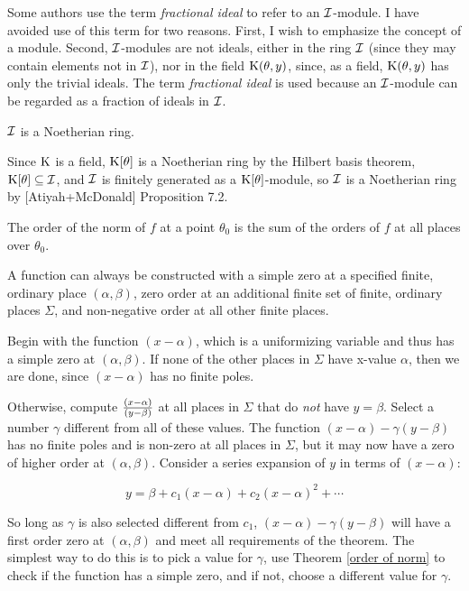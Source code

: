 Some authors use the term {\it fractional ideal} to refer to an ${\cal
I}$-module.  I have avoided use of this term for two reasons.  First,
I wish to emphasize the concept of a module.  Second, ${\cal
I}$-modules are not ideals, either in the ring ${\cal I}$ (since they
may contain elements not in ${\cal I}$), nor in the field ${\rm
K}(\theta,y)$, since, as a field, ${\rm K}(\theta,y)$ has only the trivial
ideals.  The term {\it fractional ideal} is used because an ${\cal
I}$-module can be regarded as a fraction of ideals in ${\cal I}$.

\theorem ${\cal I}$ is a Noetherian ring.
\label{I is Noetherian}

\proof

Since ${\rm K}$ is a field, ${\rm K}[\theta]$ is a Noetherian ring by
the Hilbert basis theorem, ${\rm K}[\theta] \subseteq {\cal I}$, and
${\cal I}$ is finitely generated as a ${\rm K}[\theta]$-module, so
${\cal I}$ is a Noetherian ring by [Atiyah+McDonald] Proposition 7.2.

\endtheorem

\theorem
\label{order of norm}
The order of the norm of $f$ at a point $\theta_0$ is the sum of the orders
of $f$ at all places over $\theta_0$.

\endtheorem


\theorem
\label{simple zero construction}

A function can always be constructed with a simple zero at a specified
finite, ordinary place $(\alpha, \beta)$, zero order at an additional
finite set of finite, ordinary places $\Sigma$, and non-negative order
at all other finite places.

\proof

Begin with the function $(x-\alpha)$, which is a uniformizing variable
and thus has a simple zero at $(\alpha, \beta)$.  If none of the other
places in $\Sigma$ have x-value $\alpha$, then we are done, since
$(x-\alpha)$ has no finite poles.

Otherwise, compute $(x-\alpha)\over(y-\beta)$ at all places in
$\Sigma$ that do {\it not} have $y = \beta$.  Select a number
$\gamma$ different from all of these values.  The function $(x-\alpha)
- \gamma (y-\beta)$ has no finite poles and
is non-zero at all places in $\Sigma$, but it may now have a zero of
higher order at $(\alpha, \beta)$.  Consider a series expansion
of $y$ in terms of $(x-\alpha)$:

$$y = \beta + c_1 (x-\alpha) + c_2 (x-\alpha)^2 + \cdots$$

So long as $\gamma$ is also selected different from $c_1$, $(x-\alpha)
- \gamma (y-\beta)$ will have a first order zero at $(\alpha, \beta)$
and meet all requirements of the theorem.  The simplest way to do this
is to pick a value for $\gamma$, use Theorem \ref{order of norm} to
check if the function has a simple zero, and if not, choose a
different value for $\gamma$.

